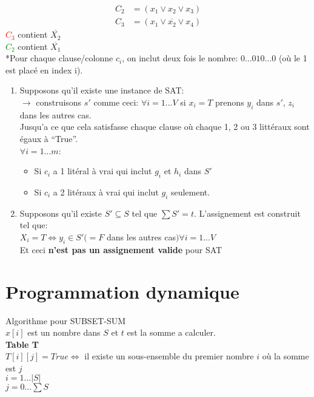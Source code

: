 \documentclass[a4paper,12pt]{article}
\begin{document}
    \begin{align*}
      C_2 &= (x_1 \vee x_2 \vee x_3)\\
      C_3 &= (x_1 \vee \overline{x_2} \vee x_4)
    \end{align*}
    \textcolor{red}{$C_3$} contient $\overline{X_2}$\\
    \textcolor{green}{$C_2$} contient $\overline{X_1}$\\
    
    *Pour chaque clause/colonne $c_i$, on inclut deux fois le nombre: $0...010...0$ (où le 1 est placé en index i).
    
    \begin{enumerate}
      \item Supposons qu'il existe une instance de SAT:\\
	  $\rightarrow$ construisons $s'$ comme ceci: $\forall i = 1 ... V$ si $x_i = T$ prenons $y_i$ dans $s'$, $z_i$ dans les autres cas.\\
	  Jusqu'a ce que cela satisfasse chaque clause où chaque 1, 2 ou 3 littéraux sont égaux à ``True''.\\
	  $\forall i = 1...m$:
	  \begin{itemize}
	    \item Si $c_i$ a 1 litéral à vrai qui inclut $g_i$ et $h_i$ dans $S'$
	    \item Si $c_i$ a 2 litéraux à vrai qui inclut $g_i$ seulement.
	  \end{itemize}
      \item Supposons qu'il existe $S' \subseteq S$ tel que $\sum S' = t$.  L’assignement est construit tel que:\\
	  $X_i = T \Leftrightarrow y_i \in S' (= F$ dans les autres cas$) \forall i = 1 ... V$\\
	  Et ceci \textbf{n'est pas un assignement valide} pour SAT
    \end{enumerate}
    
  
\section{Programmation dynamique}
  Algorithme pour SUBSET-SUM\\
  $x[i]$ est un nombre dans $S$ et $t$ est la somme a calculer.\\
  
  \textbf{Table T}\\
    $T[i][j] = True \Leftrightarrow$ il existe un sous-ensemble du premier nombre $i$ où la somme est $j$\\
    $i = 1 ... |S|$\\
    $j = 0 ... \sum S$\\
    
\end{document}
